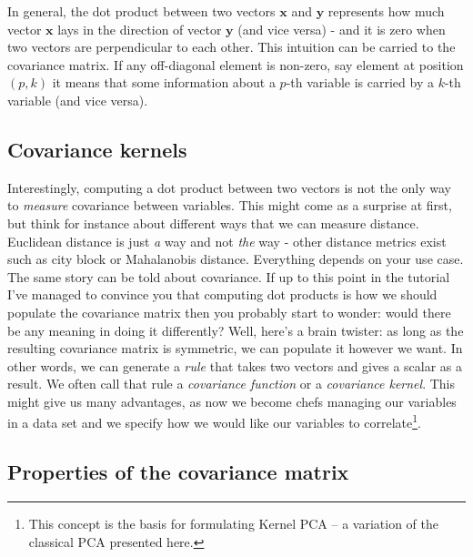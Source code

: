 \documentclass[10pt,twocolumn]{article}
\begin{document}
In general, the dot product between two vectors $\mathbf{x}$ and $\mathbf{y}$ represents how much vector $\mathbf{x}$ lays in the direction of vector $\mathbf{y}$ (and vice versa) - and it is zero when two vectors are perpendicular to each other. This intuition can be carried to the covariance matrix. If any off-diagonal element is non-zero, say element at position $(p,k)$ it means that some information about a $p$-th variable is carried by a $k$-th variable (and vice versa).

\subsection{Covariance kernels}

Interestingly, computing a dot product between two vectors is not the only way to \textit{measure} covariance between variables. This might come as a surprise at first, but think for instance about different ways that we can measure distance. Euclidean distance is just \textit{a} way and not \textit{the} way - other distance metrics exist such as city block or Mahalanobis distance. Everything depends on your use case. The same story can be told about covariance. If up to this point in the tutorial I've managed to convince you that computing dot products is how we should populate the covariance matrix then you probably start to wonder: would there be any meaning in doing it differently? Well, here's a brain twister: as long as the resulting covariance matrix is symmetric, we can populate it however we want. In other words, we can generate a \textit{rule} that takes two vectors and gives a scalar as a result. We often call that rule a \textit{covariance function} or a \textit{covariance kernel}. This might give us many advantages, as now we become chefs managing our variables in a data set and we specify how we would like our variables to correlate\footnote{This concept is the basis for formulating Kernel PCA -- a variation of the classical PCA presented here.}.


\subsection{Properties of the covariance matrix} \label{sec:covariance-properties}
\end{document}

